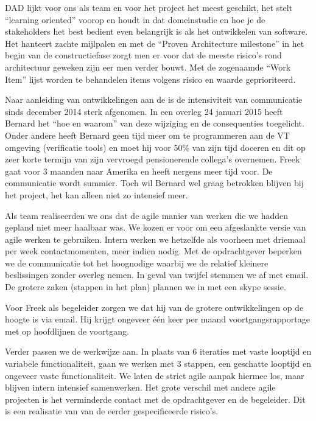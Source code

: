 \begin{description}
DAD lijkt voor ons als team en voor het project het meest geschikt, het stelt
``learning oriented'' voorop en houdt in dat domeinstudie en hoe je de stakeholders
het best bedient even belangrijk is als het ontwikkelen van software. Het hanteert
zachte mijlpalen en met de ``Proven Architecture milestone''  in het begin van de
constructiefase zorgt men er voor dat de meeste risico's rond architectuur geweken
zijn eer men verder bouwt. Met de zogenaamde ``Work Item''  lijst worden te behandelen
items volgens risico en waarde geprioriteerd.

\begin{aanpassing1}\label{aanp1: toelichting}
Naar aanleiding van ontwikkelingen aan de \ou is de intensiviteit
van communicatie sinds december 2014 sterk afgenomen. In een overleg 24 januari
2015 heeft Bernard het ``hoe en waarom'' van deze wijziging en de consequenties toegelicht. 
Onder andere heeft Bernard geen tijd meer om te programmeren aan de VT omgeving (verificatie 
tools) en moet hij voor 50\% van zijn tijd doceren en dit op zeer korte termijn van zijn vervroegd 
pensionerende collega's overnemen. Freek gaat voor 3 maanden naar Amerika en heeft nergens meer tijd voor. 
De communicatie wordt summier. Toch wil Bernard wel graag betrokken blijven bij het project,
het kan alleen niet zo intensief meer.

Als team realiseerden we ons dat de agile manier van werken die we hadden gepland niet meer haalbaar was.
We kozen er voor om een afgeslankte versie van agile werken te gebruiken. Intern werken we hetzelfde als 
voorheen met driemaal per week contactmomenten, meer indien nodig. Met de opdrachtgever beperken we de 
communicatie tot het hoognodige waarbij we de relatief kleinere beslissingen zonder overleg nemen. In geval
van twijfel stemmen we af met email. De grotere zaken (stappen in het plan) plannen we in met een skype sessie.

Voor Freek als begeleider zorgen we dat hij van de grotere ontwikkelingen op de hoogte is via email. Hij
krijgt ongeveer \'{e}\'{e}n keer per maand voortgangsrapportage met op hoofdlijnen de voortgang.

Verder passen we de werkwijze aan. In plaats van 6 iteraties met vaste looptijd en variabele functionaliteit, 
gaan we werken met 3 stappen, een geschatte looptijd en ongeveer vaste functionaliteit. We laten de strict 
agile aanpak hiermee los, maar blijven intern intensief samenwerken. Het grote verschil met andere agile 
projecten is het verminderde contact met de opdrachtgever  en de begeleider. Dit is een realisatie van 
\een van de eerder gespecificeerde risico's.


\end{aanpassing1}
\end{description}
